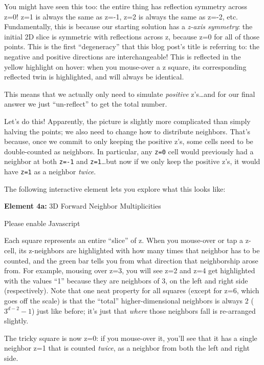 \documentclass[]{article}
\begin{document}
You might have seen this too: the entire thing has reflection symmetry across
z=0! z=1 is always the same as z=-1, z=2 is always the same as z=-2, etc.
Fundamentally, this is because our starting solution has a \emph{z-axis
symmetry}: the initial 2D slice is symmetric with reflections across z, because
z=0 for all of those points. This is the first ``degeneracy'' that this blog
post's title is referring to: the negative and positive directions are
interchangeable! This is reflected in the yellow highlight on hover: when you
mouse-over a z square, its corresponding reflected twin is highlighted, and will
always be identical.

This means that we actually only need to simulate \emph{positive} z's\ldots and
for our final answer we just ``un-reflect'' to get the total number.

Let's do this! Apparently, the picture is slightly more complicated than simply
halving the points; we also need to change how to distribute neighbors. That's
because, once we commit to only keeping the positive z's, some cells need to be
double-counted as neighbors. In particular, any \texttt{z=0} cell would
previously had a neighbor at both \texttt{z=-1} and \texttt{z=1}\ldots but now
if we only keep the positive z's, it would have \texttt{z=1} as a neighbor
\emph{twice}.

The following interactive element lets you explore what this looks like:

\leavevmode\hypertarget{golSyms3DForward}{}%
\textbf{Element 4a:} 3D Forward Neighbor Multiplicities

\leavevmode\hypertarget{golSyms3DForwardCont}{}%
Please enable Javascript

Each square represents an entire ``slice'' of z. When you mouse-over or tap a
z-cell, its z-neighbors are highlighted with how many times that neighbor has to
be counted, and the green bar tells you from what direction that neighborship
arose from. For example, mousing over z=3, you will see z=2 and z=4 get
highlighted with the values ``1'' because they are neighbors of 3, on the left
and right side (respectively). Note that one neat property for all squares
(except for z=6, which goes off the scale) is that the ``total''
higher-dimensional neighbors is always 2 (\(3^{d-2}-1\)) just like before; it's
just that \emph{where} those neighbors fall is re-arranged slightly.

The tricky square is now z=0: if you mouse-over it, you'll see that it has a
single neighbor z=1 that is counted \emph{twice}, as a neighbor from both the
left and right side.
\end{document}
